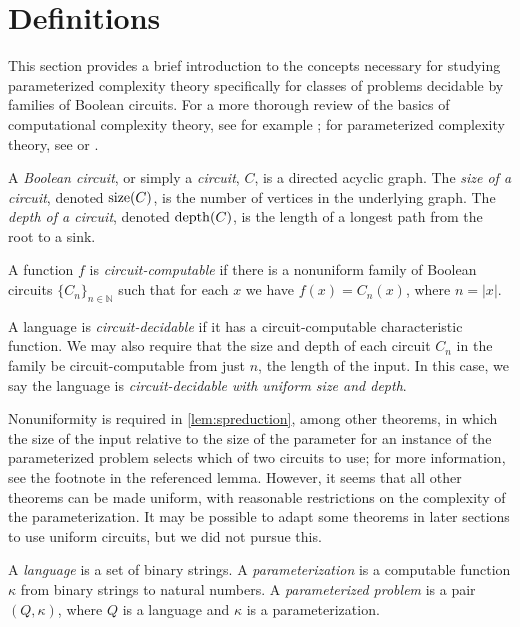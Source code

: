 \section{Definitions}

This section provides a brief introduction to the concepts necessary for studying parameterized complexity theory specifically for classes of problems decidable by families of Boolean circuits.
For a more thorough review of the basics of computational complexity theory, see for example \autocite{ab09}; for parameterized complexity theory, see \autocite{df13} or \autocite{fg06}.

\begin{definition}
  A \emph{Boolean circuit}, or simply a \emph{circuit}, $C$, is a directed acyclic graph.
  The \emph{size of a circuit}, denoted $\operatorname{size}(C)$, is the number of vertices in the underlying graph.
  The \emph{depth of a circuit}, denoted $\operatorname{depth}(C)$, is the length of a longest path from the root to a sink.
\end{definition}

\begin{definition}
  A function $f$ is \emph{circuit-computable} if there is a nonuniform family of Boolean circuits $\{C_n\}_{n \in \mathbb{N}}$ such that for each $x$ we have $f(x) = C_n(x)$, where $n = |x|$.

  A language is \emph{circuit-decidable} if it has a circuit-computable characteristic function.
  We may also require that the size and depth of each circuit $C_n$ in the family be circuit-computable from just $n$, the length of the input.
  In this case, we say the language is \emph{circuit-decidable with uniform size and depth}.
\end{definition}

Nonuniformity is required in \autoref{lem:spreduction}, among other theorems, in which the size of the input relative to the size of the parameter for an instance of the parameterized problem selects which of two circuits to use; for more information, see the footnote in the referenced lemma.
However, it seems that all other theorems can be made uniform, with reasonable restrictions on the complexity of the parameterization.
It may be possible to adapt some theorems in later sections to use uniform circuits, but we did not pursue this.

\begin{definition}
  A \emph{language} is a set of binary strings.
  A \emph{parameterization} is a computable function $\kappa$ from binary strings to natural numbers.
  A \emph{parameterized problem} is a pair $(Q, \kappa)$, where $Q$ is a language and $\kappa$ is a parameterization.
\end{definition}

